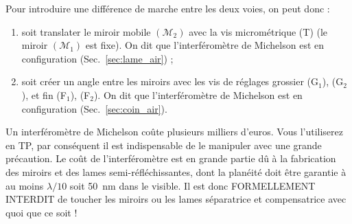 \documentclass[12pt,fancy]{cours}
\begin{document}

\noindent
 Pour introduire une différence de marche  entre les deux voies, on peut donc :
\begin{enumerate}
\item soit translater le miroir mobile $(\mathcal{M}_2)$ avec la vis micrométrique (T) (le miroir $(\mathcal{M}_1)$ est fixe). On dit que l'interféromètre de Michelson est en configuration  (Sec.~\ref{sec:lame_air}) ;
\item soit créer un angle entre les miroirs avec les vis de réglages grossier (G$_1$), (G$_2$), et fin (F$_1$), (F$_2$). On dit que l'interféromètre de Michelson est en configuration  (Sec.~\ref{sec:coin_air}).
\end{enumerate}




 \begin{remarquetech}
 Un interféromètre de Michelson coûte plusieurs milliers d'euros. Vous l'utiliserez en TP, par conséquent il est indispensable de le manipuler avec une grande précaution. Le coût de l'interféromètre est en grande partie dû à la fabrication des miroirs et des lames semi-réfléchissantes, dont la planéité doit être garantie à au moins $\lambda/10$ soit \SI{50}{nm} dans le visible. Il est donc FORMELLEMENT INTERDIT de toucher les miroirs ou les lames séparatrice et compensatrice avec quoi que ce soit !
 \end{remarquetech}
\end{document}
